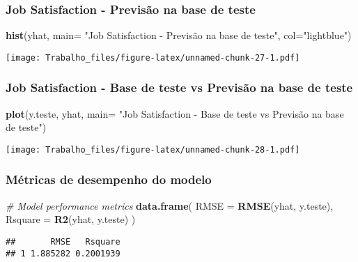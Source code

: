\documentclass[]{article}
\newenvironment{Shaded}{\begin{snugshade}}{\end{snugshade}}
\newcommand{\KeywordTok}[1]{\textcolor[rgb]{0.13,0.29,0.53}{\textbf{#1}}}
\newcommand{\DataTypeTok}[1]{\textcolor[rgb]{0.13,0.29,0.53}{#1}}
\newcommand{\StringTok}[1]{\textcolor[rgb]{0.31,0.60,0.02}{#1}}
\newcommand{\CommentTok}[1]{\textcolor[rgb]{0.56,0.35,0.01}{\textit{#1}}}
\newcommand{\NormalTok}[1]{#1}
\begin{document}
\subsubsection{Job Satisfaction - Previsão na base de
teste}\label{job-satisfaction---previsao-na-base-de-teste-1}

\begin{Shaded}
\begin{Highlighting}[]
\KeywordTok{hist}\NormalTok{(yhat, }\DataTypeTok{main=} \StringTok{"Job Satisfaction - Previsão na base de teste"}\NormalTok{, }\DataTypeTok{col=}\StringTok{"lightblue"}\NormalTok{)}
\end{Highlighting}
\end{Shaded}

\texttt{[image: Trabalho\_files/figure-latex/unnamed-chunk-27-1.pdf]}

\subsubsection{Job Satisfaction - Base de teste vs Previsão na base de
teste}\label{job-satisfaction---base-de-teste-vs-previsao-na-base-de-teste}

\begin{Shaded}
\begin{Highlighting}[]
\KeywordTok{plot}\NormalTok{(y.teste, yhat, }\DataTypeTok{main=} \StringTok{"Job Satisfaction - Base de teste vs Previsão na base de teste"}\NormalTok{)}
\end{Highlighting}
\end{Shaded}

\texttt{[image: Trabalho\_files/figure-latex/unnamed-chunk-28-1.pdf]}

\subsubsection{Métricas de desempenho do
modelo}\label{metricas-de-desempenho-do-modelo-1}

\begin{Shaded}
\begin{Highlighting}[]
\CommentTok{# Model performance metrics}
\KeywordTok{data.frame}\NormalTok{(}
  \DataTypeTok{RMSE =} \KeywordTok{RMSE}\NormalTok{(yhat, y.teste),}
  \DataTypeTok{Rsquare =} \KeywordTok{R2}\NormalTok{(yhat, y.teste)}
\NormalTok{)}
\end{Highlighting}
\end{Shaded}

\begin{verbatim}
##       RMSE   Rsquare
## 1 1.885282 0.2001939
\end{verbatim}
\end{document}
